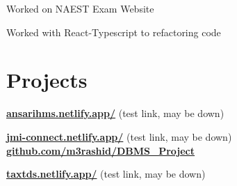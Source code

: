 \documentclass[]{deedy-resume-openfont}
\begin{document}
\begin{minipage}[t]{0.66\textwidth}
\begin{tightemize}
\item Worked on NAEST Exam Website
\item Worked with React-Typescript to refactoring code
\end{tightemize}
\sectionsep



\section{Projects} 
\href{https://ansarihms.netlify.app/}{\bf ansarihms.netlify.app/} (test link, may be down)
\sectionsep


\href{https://jmi-connect.netlify.app/}{\bf jmi-connect.netlify.app/} (test link, may be down) \\
\href{https://github.com/m3rashid/DBMS_Project}{\bf github.com/m3rashid/DBMS\_Project}
\sectionsep

\href{https://taxtds.netlify.app/}{\bf taxtds.netlify.app/} (test link, may be down)
\sectionsep

\end{minipage} 
\end{document}
